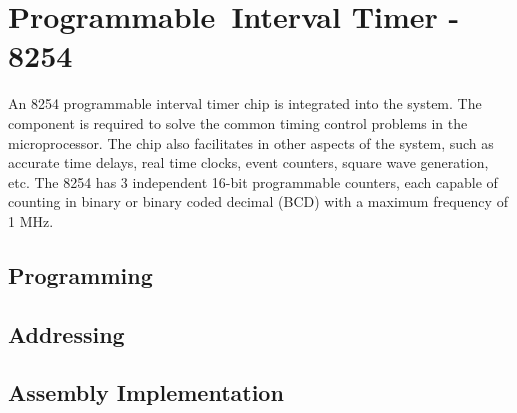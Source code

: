 \section{Programmable Interval Timer - 8254}
An 8254 programmable interval timer chip is integrated into the system. The component is required to solve the common timing control problems in the microprocessor. The chip also facilitates in other aspects of the system, such as accurate time delays, real time clocks, event counters, square wave generation, etc. The 8254 has 3 independent 16-bit programmable counters, each capable of counting in binary or binary coded decimal (BCD) with a maximum frequency of 1 MHz.

    \subsection{Programming}

    \subsection{Addressing}

    \subsection{Assembly Implementation}
